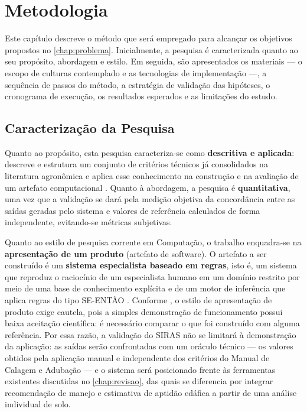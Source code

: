 \chapter{Metodologia}\label{chap:metodologia}

Este capítulo descreve o método que será empregado para alcançar os
objetivos propostos no \cref{chap:problema}. Inicialmente, a pesquisa é
caracterizada quanto ao seu propósito, abordagem e estilo. Em seguida,
são apresentados os materiais --- o escopo de culturas contemplado e as
tecnologias de implementação ---, a sequência de passos do método, a
estratégia de validação das hipóteses, o cronograma de execução, os
resultados esperados e as limitações do estudo.

\section{Caracterização da Pesquisa}\label{sec:caracterizacao}

Quanto ao propósito, esta pesquisa caracteriza-se como
\textbf{descritiva e aplicada}: descreve e estrutura um conjunto de
critérios técnicos já consolidados na literatura agronômica e aplica
esse conhecimento na construção e na avaliação de um artefato
computacional \citep{Wazlawick2014}. Quanto à abordagem, a pesquisa é
\textbf{quantitativa}, uma vez que a validação se dará pela medição
objetiva da concordância entre as saídas geradas pelo sistema e valores
de referência calculados de forma independente, evitando-se métricas
subjetivas.

Quanto ao estilo de pesquisa corrente em Computação, o trabalho
enquadra-se na \textbf{apresentação de um produto} (artefato de
software). O artefato a ser construído é um \textbf{sistema especialista
baseado em regras}, isto é, um sistema que reproduz o raciocínio de um
especialista humano em um domínio restrito por meio de uma base de
conhecimento explícita e de um motor de inferência que aplica regras do
tipo SE-ENTÃO \citep{Lanzer2010, SantosEtAl1994}. Conforme
\cite{Wazlawick2014}, o estilo de apresentação de produto exige cautela,
pois a simples demonstração de funcionamento possui baixa aceitação
científica: é necessário comparar o que foi construído com alguma
referência. Por essa razão, a validação do SIRAS não se limitará à
demonstração da aplicação: as saídas serão confrontadas com um oráculo
técnico --- os valores obtidos pela aplicação manual e independente dos
critérios do Manual de Calagem e Adubação \citep{ManualCalagem2016} ---
e o sistema será posicionado frente às ferramentas existentes
discutidas no \cref{chap:revisao}, das quais se diferencia por integrar
recomendação de manejo e estimativa de aptidão edáfica a partir de uma
análise individual de solo.

